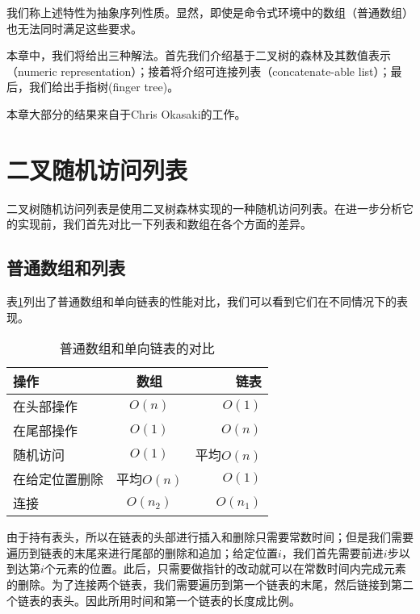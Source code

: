 \documentclass[UTF8]{article}
\begin{document}
我们称上述特性为抽象序列性质。显然，即使是命令式环境中的数组（普通数组）也无法同时满足这些要求。

本章中，我们将给出三种解法。首先我们介绍基于二叉树的森林及其数值表示（numeric representation）；接着将介绍可连接列表（concatenate-able list）；最后，我们给出手指树(finger tree)。

本章大部分的结果来自于Chris Okasaki的工作\cite{okasaki-book}。

\section{二叉随机访问列表}

二叉树随机访问列表是使用二叉树森林实现的一种随机访问列表。在进一步分析它的实现前，我们首先对比一下列表和数组在各个方面的差异。

\subsection{普通数组和列表}

表\ref{tab:array-list-comp}列出了普通数组和单向链表的性能对比，我们可以看到它们在不同情况下的表现。

\begin{table}[htbp]
\centering
\begin{tabular}{l | c | r}
  \hline
  操作 & 数组 & 链表 \\
  \hline
  在头部操作 & $O(n)$ & $O(1)$ \\
  在尾部操作 & $O(1)$ & $O(n)$ \\
  随机访问 & $O(1)$ & 平均$O(n)$ \\
  在给定位置删除 & 平均$O(n)$ & $O(1)$ \\
  连接 & $O(n_2)$ & $O(n_1)$ \\
  \hline
\end{tabular}
\caption{普通数组和单向链表的对比} \label{tab:array-list-comp}
\end{table}

由于持有表头，所以在链表的头部进行插入和删除只需要常数时间；但是我们需要遍历到链表的末尾来进行尾部的删除和追加；给定位置$i$，我们首先需要前进$i$步以到达第$i$个元素的位置。此后，只需要做指针的改动就可以在常数时间内完成元素的删除。为了连接两个链表，我们需要遍历到第一个链表的末尾，然后链接到第二个链表的表头。因此所用时间和第一个链表的长度成比例。
\end{document}
